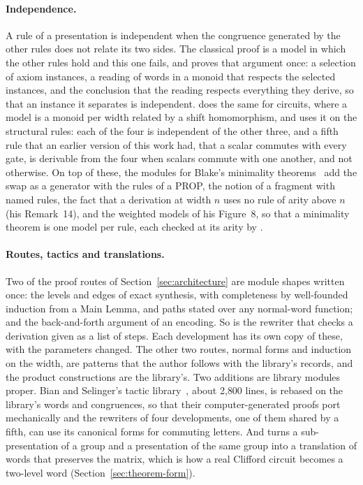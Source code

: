 \paragraph{Independence.}\label{sec:independence-layer} A rule of a
presentation is independent when the congruence generated by the other
rules does not relate its two sides. The classical proof is a model in
which the other rules hold and this one fails, and
 proves that argument once: a selection
of axiom instances, a reading of words in a monoid that respects the
selected instances, and the conclusion that the reading respects
everything they derive, so that an instance it separates is
independent.  does the same for circuits,
where a model is a monoid per width related by a shift homomorphism,
and uses it on the structural rules: each of the four is independent
of the other three, and a fifth rule that an earlier version of this
work had, that a scalar commutes with every gate, is derivable from
the four when scalars commute with one another, and not otherwise. On
top of these, the modules for Blake's minimality
theorems~\cite{blake2026simpler} add the swap as a generator with the
rules of a PROP, the notion of a fragment with named rules, the fact
that a derivation at width $n$ uses no rule of arity above $n$ (his
Remark~14), and the weighted models of his Figure~8, so that a
minimality theorem is one model per rule, each checked at its arity by
.

\paragraph{Routes, tactics and translations.} Two of the proof routes
of Section~\ref{sec:architecture} are module shapes written once: the
levels and edges of exact synthesis, with completeness by well-founded
induction from a Main Lemma, and paths stated over any normal-word
function; and the back-and-forth argument of an encoding. So is the
rewriter that checks a derivation given as a list of steps. Each
development has its own copy of these, with the parameters changed.
The other two routes, normal forms and induction on the width, are
patterns that the author follows with the library's records, and the
product constructions are the library's. Two additions are library
modules proper. Bian and Selinger's tactic
library~\cite{bian2023cliffordt2,bian2023cliffordcs3}, about 2{,}800
lines, is rebased on the library's words and congruences, so that their
computer-generated proofs port mechanically and the rewriters of four
developments, one of them shared by a fifth, can use its canonical
forms for commuting letters. And  turns a
sub-presentation of a group and a presentation of the same group into a
translation of words that preserves the matrix, which is how a real
Clifford circuit becomes a two-level word
(Section~\ref{sec:theorem-form}).

